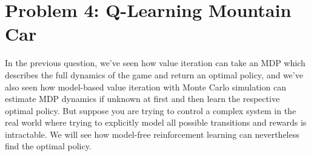 \documentclass{article}
\theoremstyle{case}
\theoremstyle{definition}
\begin{document}
\newpage

\section*{Problem 4: Q-Learning Mountain Car}

In the previous question, we've seen how value iteration can take an MDP which describes the full dynamics of the game
and return an optimal policy, and we've also seen how model-based value iteration with Monte Carlo simulation can estimate MDP dynamics if unknown at first
and then learn the respective optimal policy. But suppose you are trying to control a complex system in the real world where trying to explicitly model
all possible transitions and rewards is intractable. We will see how model-free reinforcement learning can nevertheless find the optimal policy.
\end{document}
